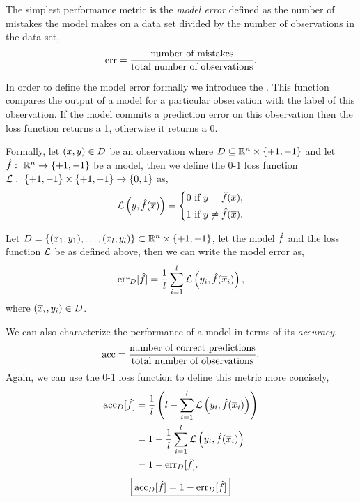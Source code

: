 \documentclass[a4paper,blends,pdf,colorBG,slideColor]{prosper}
\begin{document}
\vspace{.2in}
The simplest performance metric is the {\em model error} defined as the number of mistakes the model makes on a data set divided by the number of observations in the data set,
\begin{equation*}
\mbox{err} = \frac{\text{number of mistakes}}{\text{total number of observations}}.
\end{equation*}
\es


\small
In order to define the model error formally  we introduce the .  
This function compares the output of a model for a particular observation with the label of this observation.
If the model commits a prediction error on this observation then the loss function returns a 1, otherwise it
returns a 0.

Formally, let  $(\overline{x},y)\in D$ be an observation where
$D \subseteq \mathbb{R}^{n} \times \{+1,-1\}$ 
and let $\hat{f}\,\colon\; \mathbb{R}^{n} \rightarrow \{+1,-1\}$ be a model, then we define the
0-1 loss function ${\cal L}\,\colon\; \{+1,-1\}\times \{+1,-1\} \rightarrow \{0,1\}$ as,
\begin{equation*}
{\cal L}\left (y,\hat{f}(\overline{x})\right ) = \left\{
	\begin{aligned}
	0 & \text{ if $y = \hat{f}(\overline{x})$},\\
	1 & \text{ if $y \neq \hat{f}(\overline{x})$}.
	\end{aligned}
\right.
\end{equation*}

Let $D = \{(\overline{x}_1,y_1),\ldots,(\overline{x}_l,y_l)\} \subset \mathbb{R}^{n}\times \{+1,-1\}$, 
let the model $\hat{f}$ and the loss function ${\cal L}$ be as defined above, then we can
write the model error as,
\begin{equation*}
\mbox{err}_D[\hat{f}] = \frac{1}{l}\sum_{i=1}^{l}{\cal L}\left(y_i, \hat{f}(\overline{x}_i)\right ),
\end{equation*}
where $(\overline{x}_i,y_i)\in D$. 

\begin{center}
\end{center}
\es

\small
We can also characterize the performance of a model in terms of its {\em accuracy},
\begin{equation*}
\mbox{acc} = \frac{\text{number of correct predictions}}{\text{total number of observations}}.
\end{equation*}
Again, we can use the 0-1 loss function to define this metric more concisely,
\begin{align*}
\mbox{acc}_D[\hat{f}] &= \frac{1}{l}\left(l - \sum_{i=1}^{l}{\cal L}\left (y_i, \hat{f}(\overline{x}_i) \right )\right )\\
	&= 1 - \frac{1}{l}\sum_{i=1}^{l}{\cal L}\left (y_i, \hat{f}(\overline{x}_i)\right )\\
	&= 1 - \mbox{err}_D[\hat{f}].
\end{align*}
\vspace{.2in}
\begin{equation*}
\boxed{\mbox{acc}_D[\hat{f}]  = 1 - \mbox{err}_D[\hat{f}]}
\end{equation*}
\es
\end{document}
